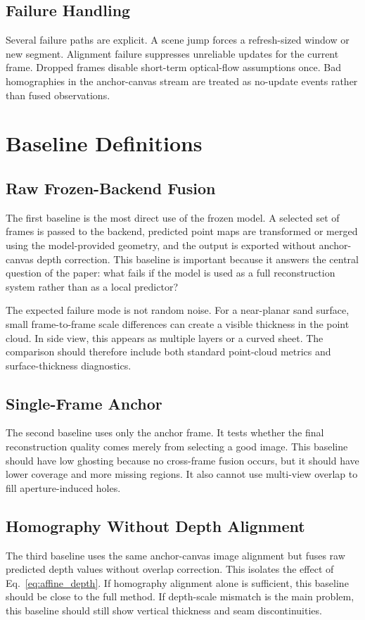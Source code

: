 \documentclass[conference]{IEEEtran}
\begin{document}
\subsection{Failure Handling}
Several failure paths are explicit. A scene jump forces a refresh-sized window or new segment. Alignment failure suppresses unreliable updates for the current frame. Dropped frames disable short-term optical-flow assumptions once. Bad homographies in the anchor-canvas stream are treated as no-update events rather than fused observations.

\section{Baseline Definitions}
\subsection{Raw Frozen-Backend Fusion}
The first baseline is the most direct use of the frozen model. A selected set of frames is passed to the backend, predicted point maps are transformed or merged using the model-provided geometry, and the output is exported without anchor-canvas depth correction. This baseline is important because it answers the central question of the paper: what fails if the model is used as a full reconstruction system rather than as a local predictor?

The expected failure mode is not random noise. For a near-planar sand surface, small frame-to-frame scale differences can create a visible thickness in the point cloud. In side view, this appears as multiple layers or a curved sheet. The comparison should therefore include both standard point-cloud metrics and surface-thickness diagnostics.

\subsection{Single-Frame Anchor}
The second baseline uses only the anchor frame. It tests whether the final reconstruction quality comes merely from selecting a good image. This baseline should have low ghosting because no cross-frame fusion occurs, but it should have lower coverage and more missing regions. It also cannot use multi-view overlap to fill aperture-induced holes.

\subsection{Homography Without Depth Alignment}
The third baseline uses the same anchor-canvas image alignment but fuses raw predicted depth values without overlap correction. This isolates the effect of Eq.~\eqref{eq:affine_depth}. If homography alignment alone is sufficient, this baseline should be close to the full method. If depth-scale mismatch is the main problem, this baseline should still show vertical thickness and seam discontinuities.
\end{document}
